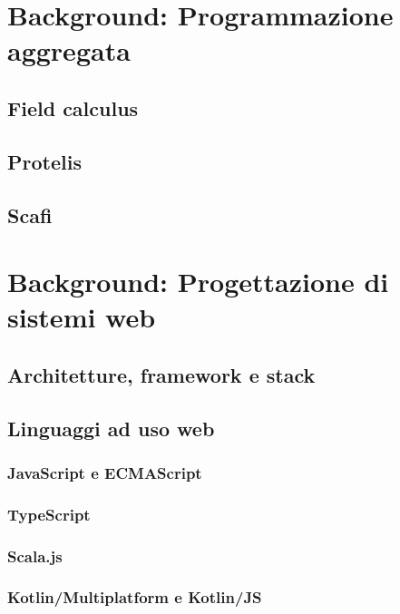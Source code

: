 \documentclass[%
  a4paper,                %
  12pt,                   %
  twoside,                %
  openright,              %
  titlepage,              %
  final                   %
]{scrbook}
\begin{document}
  \frontmatter{}
  \pagestyle{empty}
  
  
  
  
  \tableofcontents

  \mainmatter{}
  \pagestyle{headings}

  \chapter{Background: Programmazione aggregata}
    \section{Field calculus}
    \section{Protelis}
    \section{Scafi}

  \chapter{Background: Progettazione di sistemi web}
    \section{Architetture, framework e stack}
    \section{Linguaggi ad uso web}
      \subsection{JavaScript e ECMAScript}
      \subsection{TypeScript}
      \subsection{Scala.js}
      \subsection{Kotlin/Multiplatform e Kotlin/JS}
\end{document}

